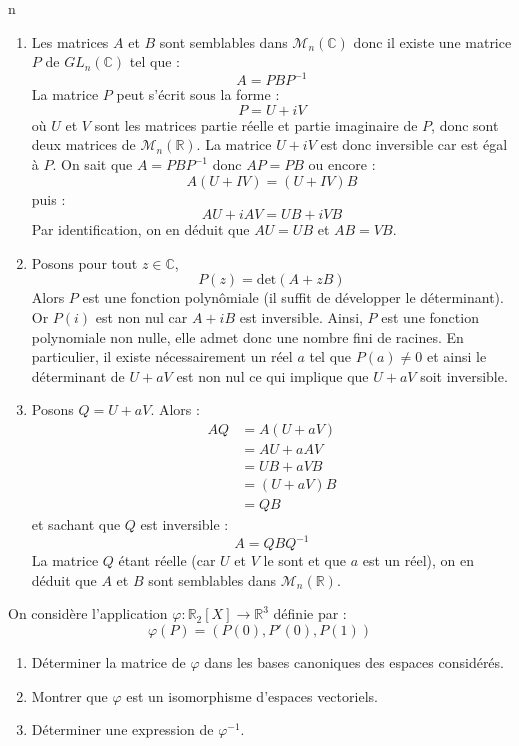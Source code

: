 n\documentclass[a4paper,10pt]{report}
\begin{document}
\corr \begin{enumerate}
\item Les matrices $A$ et $B$ sont semblables dans $\mathcal{M}_n(\mathbb{C})$ donc il existe une matrice $P$ de $GL_n(\mathbb{C})$ tel que :
$$ A=PBP^{-1}$$
La matrice $P$ peut s'écrit sous la forme :
$$ P = U+i V$$
où $U$ et $V$ sont les matrices \og partie réelle \fg et \og partie imaginaire \fg de $P$, donc sont deux matrices de $\mathcal{M}_n(\mathbb{R})$. La matrice $U+iV$ est donc inversible car est égal à $P$. On sait que $A=PBP^{-1}$ donc $AP=PB$ ou encore :
$$ A(U+IV) = (U+IV)B$$
puis :
$$ AU+ i AV = UB + i VB$$
Par identification, on en déduit que $AU=UB$ et $AB=VB$.
\item Posons pour tout $z \in \mathbb{C}$,
$$ P(z) = \textrm{det}(A+zB)$$
Alors $P$ est une fonction polynômiale (il suffit de développer le déterminant). Or $P(i)$ est non nul car $A+iB$ est inversible. Ainsi, $P$ est une fonction polynomiale non nulle, elle admet donc une nombre fini de racines. En particulier, il existe nécessairement un réel $a$ tel que $P(a) \neq 0$ et ainsi le déterminant de $U+aV$ est non nul ce qui implique que $U+aV$ soit inversible.
\item Posons $Q=U+aV$. Alors :
\begin{align*}
AQ & = A(U+aV) \\
& = AU + a AV \\
& = UB + a VB \\
& = (U+aV)B \\
& = QB
\end{align*}
et sachant que $Q$ est inversible :
$$ A= QBQ^{-1}$$
La matrice $Q$ étant réelle (car $U$ et $V$ le sont et que $a$ est un réel), on en déduit que $A$ et $B$ sont semblables dans $\mathcal{M}_n(\mathbb{R})$.
\end{enumerate}

\begin{Exercice}{} On considère l'application $\varphi : \mathbb{R}_2[X] \rightarrow \mathbb{R}^3$ définie par :
\[ \varphi(P)=(P(0),P'(0),P(1)) \]

\begin{enumerate}
\item Déterminer la matrice de $\varphi$ dans les bases canoniques des espaces considérés.
\item Montrer que $\varphi$ est un isomorphisme d'espaces vectoriels.
\item Déterminer une expression de $\varphi^{-1}$.
\end{enumerate}
\end{Exercice} 
\end{document}
